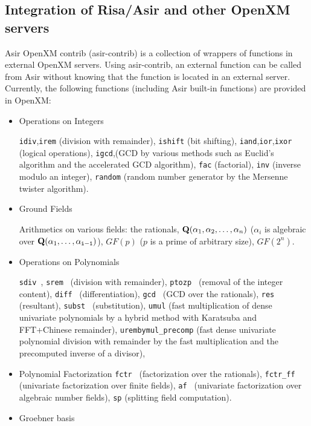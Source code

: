 \documentclass[12pt]{article}
\begin{document}
\subsection{Integration of Risa/Asir and other OpenXM servers}

Asir OpenXM contrib (asir-contrib) is a collection of wrappers of
functions in external OpenXM servers. Using asir-contrib,
an external function can be called 
from Asir without knowing that the function is located in
an external server. Currently, the following functions (including
Asir built-in functions) are provided
in OpenXM:

\begin{itemize}
\item Operations on Integers

{\tt idiv},{\tt irem} (division with remainder),
{\tt ishift} (bit shifting),
{\tt iand},{\tt ior},{\tt ixor} (logical operations),
{\tt igcd},(GCD by various methods such as Euclid's algorithm and
the accelerated GCD algorithm),
{\tt fac} (factorial),
{\tt inv} (inverse modulo an integer),
{\tt random} (random number generator by the Mersenne twister algorithm).

\item Ground Fields

Arithmetics on various fields: the rationals,
${\bf Q}(\alpha_1,\alpha_2,\ldots,\alpha_n)$
($\alpha_i$ is algebraic over ${\bf Q}(\alpha_1,\ldots,\alpha_{\tt i-1})$),
$GF(p)$ ($p$ is a prime of arbitrary size), $GF(2^n)$.

\item Operations on Polynomials

{\tt sdiv }, {\tt srem } (division with remainder),
{\tt ptozp } (removal of the integer content),
{\tt diff } (differentiation),
{\tt gcd } (GCD over the rationals),
{\tt res } (resultant),
{\tt subst } (substitution),
{\tt umul} (fast multiplication of dense univariate polynomials
by a hybrid method with Karatsuba and FFT+Chinese remainder),
{\tt urembymul\_precomp} (fast dense univariate polynomial
division with remainder by the fast multiplication and
the precomputed inverse of a divisor),

\item Polynomial Factorization
{\tt fctr } (factorization over the rationals),
{\tt fctr\_ff } (univariate factorization over finite fields),
{\tt af } (univariate factorization over algebraic number fields),
{\tt sp} (splitting field computation).

\item Groebner basis


\end{itemize}
\end{document}
